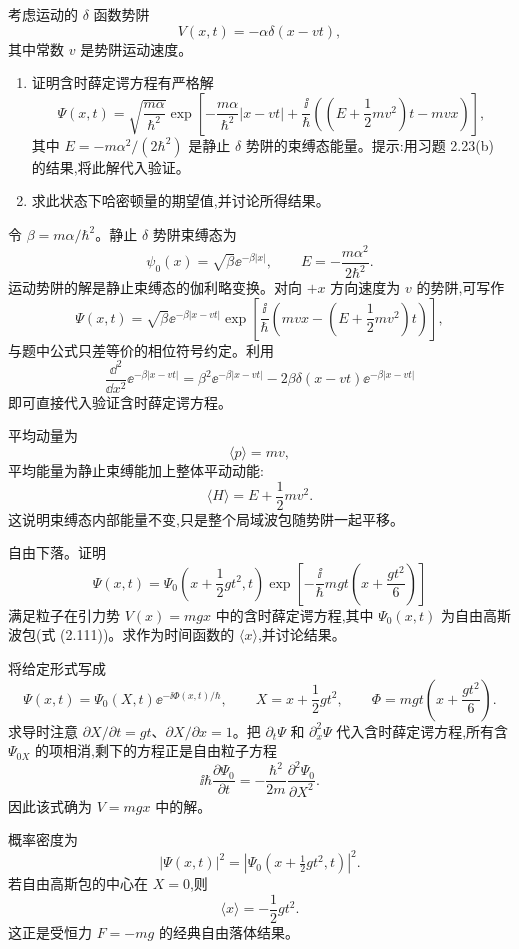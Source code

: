 \begin{question}
考虑运动的 $\delta$ 函数势阱
\[
V(x,t)=-\alpha\delta(x-vt),
\]
其中常数 $v$ 是势阱运动速度。
\begin{enumerate}
\item 证明含时薛定谔方程有严格解
\[
\Psi(x,t)=\sqrt{\frac{m\alpha}{\hbar^2}}
\exp\!\left[-\frac{m\alpha}{\hbar^2}|x-vt|+\frac{\ii}{\hbar}\left((E+\frac12mv^2)t-mvx\right)\right],
\]
其中 $E=-m\alpha^2/(2\hbar^2)$ 是静止 $\delta$ 势阱的束缚态能量。提示:用习题 2.23(b) 的结果,将此解代入验证。
\item 求此状态下哈密顿量的期望值,并讨论所得结果。
\end{enumerate}
\begin{solution}
令 $\beta=m\alpha/\hbar^2$。静止 $\delta$ 势阱束缚态为
\[
\psi_0(x)=\sqrt\beta \ee^{-\beta|x|},
\qquad
E=-\frac{m\alpha^2}{2\hbar^2}.
\]
运动势阱的解是静止束缚态的伽利略变换。对向 $+x$ 方向速度为 $v$ 的势阱,可写作
\[
\Psi(x,t)=\sqrt\beta \ee^{-\beta|x-vt|}
\exp\left[\frac{\ii}{\hbar}\left(mvx-\left(E+\frac12mv^2\right)t\right)\right],
\]
与题中公式只差等价的相位符号约定。利用
\[
\frac{\dd^2}{\dd x^2}\ee^{-\beta|x-vt|}
=\beta^2\ee^{-\beta|x-vt|}-2\beta\delta(x-vt)\ee^{-\beta|x-vt|}
\]
即可直接代入验证含时薛定谔方程。

平均动量为
\[
\langle p\rangle=mv,
\]
平均能量为静止束缚能加上整体平动动能:
\[
\langle H\rangle=E+\frac12mv^2.
\]
这说明束缚态内部能量不变,只是整个局域波包随势阱一起平移。
\end{solution}
\end{question}

\begin{question}
自由下落。证明
\[
\Psi(x,t)=\Psi_0\left(x+\frac12gt^2,t\right)
\exp\left[-\frac{\ii}{\hbar}mgt\left(x+\frac{g t^2}{6}\right)\right]
\]
满足粒子在引力势 $V(x)=mgx$ 中的含时薛定谔方程,其中 $\Psi_0(x,t)$ 为自由高斯波包(式 (2.111))。求作为时间函数的 $\langle x\rangle$,并讨论结果。

\par\smallskip
{}

\begin{solution}
将给定形式写成
\[
\Psi(x,t)=\Psi_0(X,t)\ee^{-\ii\Phi(x,t)/\hbar},
\qquad
X=x+\frac12gt^2,
\qquad
\Phi=mgt\left(x+\frac{gt^2}{6}\right).
\]
求导时注意 $\partial X/\partial t=gt$、$\partial X/\partial x=1$。把 $\partial_t\Psi$ 和 $\partial_x^2\Psi$ 代入含时薛定谔方程,所有含 $\Psi_{0X}$ 的项相消,剩下的方程正是自由粒子方程
\[
\ii\hbar\frac{\partial\Psi_0}{\partial t}
=-\frac{\hbar^2}{2m}\frac{\partial^2\Psi_0}{\partial X^2}.
\]
因此该式确为 $V=mgx$ 中的解。

概率密度为
\[
|\Psi(x,t)|^2=|\Psi_0(x+\tfrac12gt^2,t)|^2.
\]
若自由高斯包的中心在 $X=0$,则
\[
\langle x\rangle=-\frac12gt^2.
\]
这正是受恒力 $F=-mg$ 的经典自由落体结果。
\end{solution}
\end{question}

